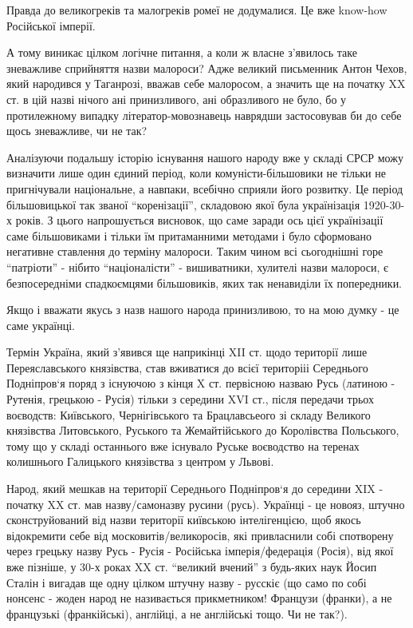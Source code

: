 Правда до великогреків та малогреків ромеї не додумалися. Це вже know-how
Російської імперії.

А тому виникає цілком логічне питання, а коли ж власне з’явилось таке
зневажливе сприйняття назви малороси? Адже великий письменник Антон Чехов, який
народився у Таганрозі, вважав себе малоросом, а значить ще на початку XX ст. в
цій назві нічого ані принизливого, ані образливого не було, бо у протилежному
випадку літератор-мовознавець наврядши застосовував би до себе щось зневажливе,
чи не так? 

Аналізуючи подальшу історію існування нашого народу вже у складі СРСР можу
визначити лише один єдиний період, коли комуністи-більшовики не тільки не
пригнічували національне, а навпаки, всебічно сприяли його розвитку. Це період
більшовицької так званої “коренізації”, складовою якої була українізація
1920-30-х років. З цього напрошується висновок, що саме заради ось цієї
українізації саме більшовиками і тільки їм притаманними методами і було
сформовано негативне ставлення до терміну малороси. Таким чином всі сьогоднішні
горе “патріоти” - нібито “націоналісти” - вишиватники, хулителі назви малороси,
є безпосередніми спадкоємцями більшовиків, яких так ненавиділи їх попередники.

Якщо і вважати якусь з назв нашого народа принизливою, то на мою думку - це саме українці. 

Термін Україна, який з’явився ще наприкінці XII ст. щодо території лише
Переяславського князівства, став вживатися до всієї територііі Середнього
Подніпров‘я поряд з існуючою з кінця X ст. первісною назваю Русь (латиною -
Рутенія, грецькою - Русія) тільки з середини XVI ст., після передачи трьох
воєводств: Київського, Чернігівського та Брацлавсьеого зі складу Великого
князівства Литовського, Руського та Жемайтійського до Королівства Польського,
тому що у складі останнього вже існувало Руське воєводство на теренах
колишнього Галицького князівства з центром у Львові.

Народ, який мешкав на території Середнього Подніпров‘я до середини XIX -
початку XX ст. мав назву/самоназву русини (русь). Українці - це новояз, штучно
сконструйований від назви території київською інтелігенцією, щоб якось
відокремити себе від московитів/великоросів, які привласнили собі спотворену
через грецьку назву Русь - Русія - Російська імперія/федерація (Росія), від
якої вже пізніше, у 30-х роках XX ст. “великий вчений” з будь-яких наук Йосип
Сталін і вигадав ще одну цілком штучну назву - русскіє (що само по собі нонсенс
- жоден народ не називається прикметником! Французи (франки), а не французькі
(франкійські), англійці, а не англійські тощо. Чи не так?).

